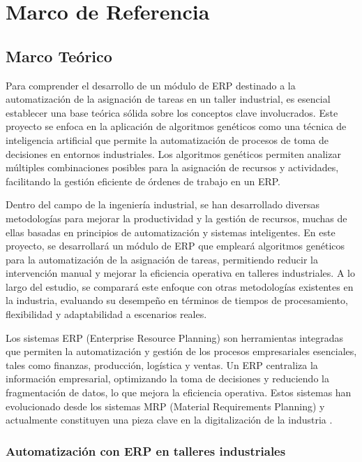 \chapter{Marco de Referencia}

\section{Marco Teórico}
Para comprender el desarrollo de un módulo de ERP destinado a la automatización de la asignación de tareas en un taller industrial, es esencial establecer una base teórica sólida sobre los conceptos clave involucrados. Este proyecto se enfoca en la aplicación de algoritmos genéticos como una técnica de inteligencia artificial que permite la automatización de procesos de toma de decisiones en entornos industriales. Los algoritmos genéticos permiten analizar múltiples combinaciones posibles para la asignación de recursos y actividades, facilitando la gestión eficiente de órdenes de trabajo en un ERP.

Dentro del campo de la ingeniería industrial, se han desarrollado diversas metodologías para mejorar la productividad y la gestión de recursos, muchas de ellas basadas en principios de automatización y sistemas inteligentes. En este proyecto, se desarrollará un módulo de ERP que empleará algoritmos genéticos para la automatización de la asignación de tareas, permitiendo reducir la intervención manual y mejorar la eficiencia operativa en talleres industriales. A lo largo del estudio, se comparará este enfoque con otras metodologías existentes en la industria, evaluando su desempeño en términos de tiempos de procesamiento, flexibilidad y adaptabilidad a escenarios reales.

Los sistemas ERP (Enterprise Resource Planning) son herramientas integradas que permiten la automatización y gestión de los procesos empresariales esenciales, tales como finanzas, producción, logística y ventas. Un ERP centraliza la información empresarial, optimizando la toma de decisiones y reduciendo la fragmentación de datos, lo que mejora la eficiencia operativa. Estos sistemas han evolucionado desde los sistemas MRP (Material Requirements Planning) y actualmente constituyen una pieza clave en la digitalización de la industria \cite{ref1}.

\subsection{Automatización con ERP en talleres industriales}

